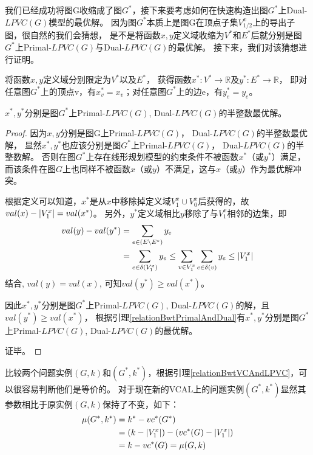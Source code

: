 我们已经成功将图G收缩成了图$G^*$，接下来要考虑如何在快速构造出图$G^*$上Dual-$LPVC(G)$模型的最优解。
因为图$G^*$本质上是图G在顶点子集$V^x_{1/2}$上的导出子图，很自然的我们会猜想，
是不是将函数$x,y$定义域收缩为$V^*$和$E^*$后就分别是图$G^*$上Primal-$LPVC(G)$与Dual-$LPVC(G)$的最优解。
接下来，我们对该猜想进行证明。

将函数$x,y$定义域分别限定为$V^*$以及$E^*$，
获得函数$x^*:V^* \rightarrow \mathbb{R}$及$y^*:E^* \rightarrow \mathbb{R}$，
即对任意图$G^*$上的顶点v，有$x^*_v=x_v$；对任意图$G^*$上的边e，有$y^*_e=y_e$。
\begin{claim}
$x^*, y^*$分别是图$G^*$上Primal-$LPVC(G)$, Dual-$LPVC(G)$的半整数最优解。
\end{claim}
\begin{proof}
因为$x, y$分别是图G上Primal-$LPVC(G)$， Dual-$LPVC(G)$的半整数最优解，
显然$x^*, y^*$也应该分别是图$G^*$上Primal-$LPVC(G)$， Dual-$LPVC(G)$的半整数解。
否则在图$G^*$上存在线形规划模型的约束条件不被函数$x^*$（或$y^*$）满足，而该条件在图$G$上也同样不被函数$x$（或$y$）不满足，这与$x$（或$y$）作为最优解冲突。

根据定义可以知道，$x^*$是从$x$中移除掉定义域$V^x_1 \cup V^x_0$后获得的，故$val(x) - \left\vert V^x_1 \right\vert = val(x^*)$。
另外，$y^*$定义域相比$y$移除了与$V^x_1$相邻的边集，即
\begin{equation*} \begin{aligned}
val(y) - val(y^*) & = \sum_{e \in (E \setminus E^*)}{y_e}
\\ & = \sum_{e \in \delta(V^x_1)}{y_e}  \le \sum_{v \in V^x_1}{\sum_{e \in \delta(v)}{y_e}}\le\left\vert V^x_1 \right\vert
\end{aligned}\end{equation*}
结合, $val(y) = val(x)$, 可知$val(y^*) \ge val(x^*)$。

因此$x^*, y^*$分别是图$G^*$上Primal-$LPVC(G)$, Dual-$LPVC(G)$的解，且$val(y^*) \ge val(x^*)$，
根据引理\ref{relationBwtPrimalAndDual}有$x^*, y^*$分别是图$G^*$上Primal-$LPVC(G)$, Dual-$LPVC(G)$的最优解。

证毕。
\end{proof}

比较两个问题实例$(G, k)$和$(G^*, k^*)$，根据引理\ref{relationBwtVCAndLPVC}，可以很容易判断他们是等价的。
对于现在新的VCAL上的问题实例$(G^*, k^*)$显然其参数相比于原实例$(G, k)$保持了不变，如下：
\begin{equation*} \begin{aligned}
  \mu(G^*, k^*) &= k^* - vc^*(G^*) \\
                &= (k - \left\vert V^x_1 \right\vert) - (vc^*(G) - \left\vert V^x_1 \right\vert) \\
                &= k - vc^*(G) = \mu(G, k)
\end{aligned} \end{equation*}

